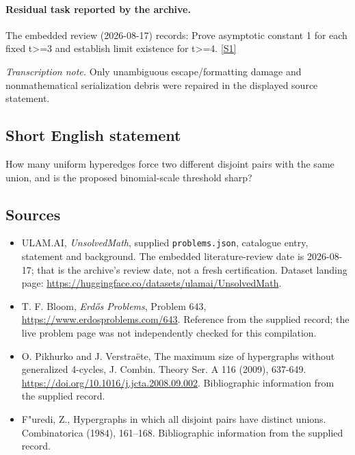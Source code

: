 \documentclass[11pt,a4paper]{article}
\newcommand{\sref}[2]{\hyperlink{source:#1:#2}{[S#2]}}
\begin{document}
\paragraph{Residual task reported by the archive.}

The embedded review (2026-08-17) records: Prove asymptotic constant 1 for each fixed t>=3 and establish limit existence for t>=4. \sref{statement}{1}

{\small\emph{Transcription note.} Only unambiguous escape/formatting damage and nonmathematical serialization debris were repaired in the displayed source statement.}

\subsection{Short English statement}

How many uniform hyperedges force two different disjoint pairs with the same union, and is the proposed binomial-scale threshold sharp?

\subsection{Sources}

{\small

\begin{itemize}

\item[\hypertarget{source:statement:1}{S1}] ULAM.AI, \emph{UnsolvedMath}, supplied \texttt{problems.json}, catalogue entry, statement and background. The embedded literature-review date is 2026-08-17; that is the archive’s review date, not a fresh certification. Dataset landing page: \url{https://huggingface.co/datasets/ulamai/UnsolvedMath}.

\item[\hypertarget{source:statement:2}{S2}] T. F. Bloom, \emph{Erdős Problems}, Problem 643, \url{https://www.erdosproblems.com/643}. Reference from the supplied record; the live problem page was not independently checked for this compilation.

\item[\hypertarget{source:statement:3}{S3}] O. Pikhurko and J. Verstraëte, The maximum size of hypergraphs without generalized 4-cycles, J. Combin. Theory Ser. A 116 (2009), 637-649. \url{https://doi.org/10.1016/j.jcta.2008.09.002}. Bibliographic information from the supplied record.

\item[\hypertarget{source:statement:4}{S4}] F"uredi, Z., Hypergraphs in which all disjoint pairs have distinct unions. Combinatorica (1984), 161--168. Bibliographic information from the supplied record.

\end{itemize}

}

\label{end:statement}
\end{document}
